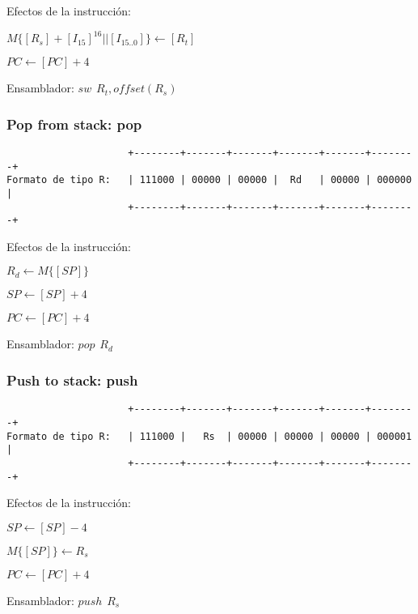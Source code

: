 \documentclass[letterpaper,11pt]{scrartcl}
\begin{document}
Efectos de la instrucción: 

$M\{[R_{s}] + [I_{15}]^{16} || [I_{15..0}] \} \leftarrow [R_{t}] $

$PC \leftarrow [PC] + 4$

Ensamblador: $sw\hspace{5pt}R_{t}, offset(R_{s})$


\subsubsection*{Pop from stack: \textbf{pop}}

\begin{verbatim}
                     +--------+-------+-------+-------+-------+--------+ 
Formato de tipo R:   | 111000 | 00000 | 00000 |  Rd   | 00000 | 000000 | 
                     +--------+-------+-------+-------+-------+--------+ 
\end{verbatim}

Efectos de la instrucción: 

$R_d \leftarrow M\{[SP]\}$

$SP \leftarrow [SP] + 4$

$PC \leftarrow [PC] + 4$

Ensamblador: $pop\hspace{5pt}R_{d}$


\subsubsection*{Push to stack: \textbf{push}}

\begin{verbatim}
                     +--------+-------+-------+-------+-------+--------+ 
Formato de tipo R:   | 111000 |   Rs  | 00000 | 00000 | 00000 | 000001 | 
                     +--------+-------+-------+-------+-------+--------+ 
\end{verbatim}

Efectos de la instrucción: 

$SP \leftarrow [SP] - 4$

$M\{[SP]\} \leftarrow R_s $

$PC \leftarrow [PC] + 4$

Ensamblador: $push\hspace{5pt}R_{s}$
\end{document}
